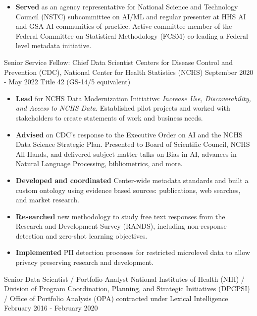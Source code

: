 \documentclass[]{scrartcl}
\begin{document}
\begin{cleanCV}
{\begin{itemize}
      \item \textbf{Served} as an agency representative for National Science and Technology Council (NSTC) subcommittee on AI/ML and regular presenter at HHS AI and GSA AI communities of practice. Active committee member of the Federal Committee on Statistical Methodology (FCSM) co-leading a Federal level metadata initiative.

  \end{itemize}
}

\vspace{1em}

    
  \WorkExperience
{}
{Senior Service Fellow: Chief Data Scientist}
{
  \newline Centers for Disease Control and Prevention (CDC), National Center for
Health Statistics (NCHS)
  \newline September 2020 - May 2022
  \newline Title 42 (GS-14/5 equivalent)
}
{
  \vspace{-0.25em}
  \begin{itemize}

   \item \textbf{Lead} for NCHS Data Modernization Initiative: \emph{Increase Use, Discoverability, and Access to NCHS Data}. Established pilot projects and worked with stakeholders to create statements of work and business needs.
   \item \textbf{Advised} on CDC's response to the Executive Order on AI and the NCHS Data Science Strategic Plan. Presented to Board of Scientific Council, NCHS All-Hands, and delivered subject matter talks on Bias in AI, advances in Natural Language Processing, bibliometrics, and more.
   \item \textbf{Developed and coordinated} Center-wide metadata standards and built a custom ontology using evidence based sources: publications, web searches, and market research.
   \item \textbf{Researched} new methodology to study free text responses from the Research and Development Survey (RANDS), including non-response detection and zero-shot learning objectives.
   \item \textbf{Implemented} PII detection processes for restricted microlevel data to allow privacy preserving research and development.
  \end{itemize}
}
  
  \WorkExperience
{}
{Senior Data Scientist / Portfolio Analyst}
{
  \newline National Institutes of Health (NIH) / Division of Program Coordination, Planning, and Strategic Initiatives (DPCPSI) / Office of Portfolio Analysis (OPA) contracted under Lexical Intelligence
  \newline February 2016 - February 2020
}
{
  \vspace{-0.25em}
  \begin{itemize}
    

\end{itemize}}
\end{cleanCV}
\end{document}
